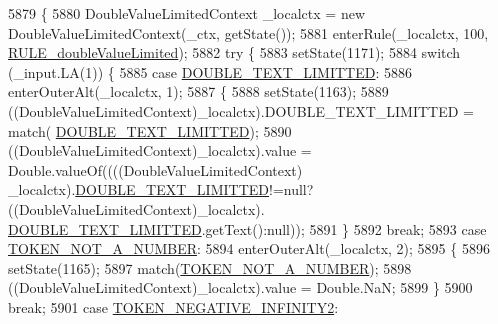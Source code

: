 \begin{DoxyCode}
5879                                                                                           \{
5880     DoubleValueLimitedContext \_localctx = \textcolor{keyword}{new} DoubleValueLimitedContext(\_ctx, getState());
5881     enterRule(\_localctx, 100, \hyperlink{classgov_1_1nasa_1_1jpf_1_1inspector_1_1server_1_1expression_1_1parser_1_1_expression_grammar_parser_adc313d7e41c4bd2bc70fd3c607d4f57b}{RULE\_doubleValueLimited});
5882     \textcolor{keywordflow}{try} \{
5883       setState(1171);
5884       \textcolor{keywordflow}{switch} (\_input.LA(1)) \{
5885       \textcolor{keywordflow}{case} \hyperlink{classgov_1_1nasa_1_1jpf_1_1inspector_1_1server_1_1expression_1_1parser_1_1_expression_grammar_parser_a68673c70894625a52edf0c22579e7f01}{DOUBLE\_TEXT\_LIMITTED}:
5886         enterOuterAlt(\_localctx, 1);
5887         \{
5888         setState(1163);
5889         ((DoubleValueLimitedContext)\_localctx).DOUBLE\_TEXT\_LIMITTED = match(
      \hyperlink{classgov_1_1nasa_1_1jpf_1_1inspector_1_1server_1_1expression_1_1parser_1_1_expression_grammar_parser_a68673c70894625a52edf0c22579e7f01}{DOUBLE\_TEXT\_LIMITTED});
5890          ((DoubleValueLimitedContext)\_localctx).value =  Double.valueOf((((DoubleValueLimitedContext)
      \_localctx).\hyperlink{classgov_1_1nasa_1_1jpf_1_1inspector_1_1server_1_1expression_1_1parser_1_1_expression_grammar_parser_a68673c70894625a52edf0c22579e7f01}{DOUBLE\_TEXT\_LIMITTED}!=null?((DoubleValueLimitedContext)\_localctx).
      \hyperlink{classgov_1_1nasa_1_1jpf_1_1inspector_1_1server_1_1expression_1_1parser_1_1_expression_grammar_parser_a68673c70894625a52edf0c22579e7f01}{DOUBLE\_TEXT\_LIMITTED}.getText():null)); 
5891         \}
5892         \textcolor{keywordflow}{break};
5893       \textcolor{keywordflow}{case} \hyperlink{classgov_1_1nasa_1_1jpf_1_1inspector_1_1server_1_1expression_1_1parser_1_1_expression_grammar_parser_a76c92660cd85fa75e4f84293b7d2f9e1}{TOKEN\_NOT\_A\_NUMBER}:
5894         enterOuterAlt(\_localctx, 2);
5895         \{
5896         setState(1165);
5897         match(\hyperlink{classgov_1_1nasa_1_1jpf_1_1inspector_1_1server_1_1expression_1_1parser_1_1_expression_grammar_parser_a76c92660cd85fa75e4f84293b7d2f9e1}{TOKEN\_NOT\_A\_NUMBER});
5898          ((DoubleValueLimitedContext)\_localctx).value =  Double.NaN; 
5899         \}
5900         \textcolor{keywordflow}{break};
5901       \textcolor{keywordflow}{case} \hyperlink{classgov_1_1nasa_1_1jpf_1_1inspector_1_1server_1_1expression_1_1parser_1_1_expression_grammar_parser_ab417adbf89dc0b5716187cf20598132a}{TOKEN\_NEGATIVE\_INFINITY2}:

\end{DoxyCode}
